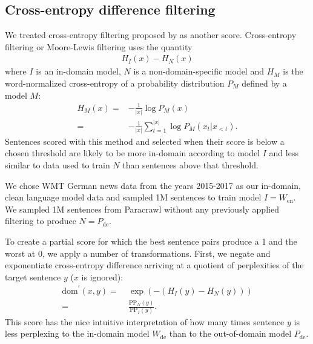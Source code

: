 \documentclass[11pt,a4paper]{article}
\begin{document}
\subsection{Cross-entropy difference filtering}

We treated cross-entropy filtering proposed by  as another score. Cross-entropy filtering or Moore-Lewis filtering uses the quantity
\begin{equation}
\begin{aligned}
H_{I}(x) - H_{N}(x)
\end{aligned}
\end{equation}
where $I$ is an in-domain model, $N$ is a non-domain-specific model and $H_M$ is the word-normalized cross-entropy of a probability distribution $P_M$ defined by a model $M$:
\begin{equation*}
\begin{aligned}
H_M(x) =& -\frac{1}{|x|}\log P_M(x) \\
 =& -\frac{1}{|x|} \sum_{t = 1}^{|x|}\log P_M(x_t|x_{<t}).
\end{aligned}
\end{equation*}
Sentences scored with this method and selected when their score is below a chosen threshold are likely to be more in-domain according to model $I$ and less similar to data used to train $N$ than sentences above that threshold. 

We chose WMT German news data from the years 2015-2017 as our in-domain, clean language model data and sampled 1M sentences to train model $I=W_{\mathrm{en}}$. We sampled 1M sentences from Paracrawl without any previously applied filtering to produce $N=P_{\mathrm{de}}$.

To create a partial score for which the best sentence pairs produce a 1 and the worst at 0, we apply a number of transformations. First, we negate and exponentiate cross-entropy difference arriving at a quotient of perplexities of the target sentence $y$ ($x$ is ignored):
\begin{equation*}
\begin{aligned}
\mathrm{dom}^\prime(x,y) = & \; \exp(-(H_{I}(y) - H_{N}(y))) \\ = & \; \frac{\mathrm{PP}_{N}(y)}{\mathrm{PP}_{I}(y)}.
\end{aligned}
\end{equation*}
This score has the nice intuitive interpretation of how many times sentence $y$ is less perplexing to the in-domain model $W_{\mathrm{de}}$ than to the out-of-domain model $P_{\mathrm{de}}$. 
\end{document}
